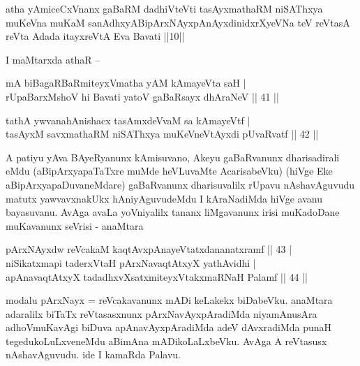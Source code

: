 \begin{shl}
atha yAmiceCxVnanx gaBaRM dadhiVteVti tasAyxmathaRM niSAThxya muKeVna muKaM sanAdhxyABipArxNAyxpAnAyxdinidxrXyeVNa teV reVtasA reVta Adada itayxreVtA Eva Bavati ||10||
\end{shl}

\begin{artha}
I maMtarxda athaR --
\end{artha}

\begin{shl}
mA biBagaRBaRmiteyxVmatha yAM kAmayeVta saH | \\
rUpaBarxMshoV hi Bavati yatoV gaBaRsayx dhAraNeV \hfill|| 41 || 
\end{shl}

\begin{shl}
tathA ywvanahAnishacx tasAmxdeVvaM sa kAmayeVtf | \\
tasAyxM savxmathaRM niSAThxya muKeVneVtAyxdi pUvaRvatf \hfill|| 42 || 
\end{shl}

\begin{artha}
A patiyu yAva BAyeRyanunx kAmisuvano, Akeyu gaBaRvanunx dharisadirali 
eMdu (aBipArxyapaTaTxre muMde heVLuvaMte AcarisabeVku) (hiVge Eke 
aBipArxyapaDuvaneMdare) gaBaRvanunx dharisuvalilx rUpavu nAshavAguvudu 
matutx yawvavxnakUkx hAniyAguvudeMdu I kAraNadiMda hiVge avanu 
bayasuvanu. AvAga avaLa yoVniyalilx tananx liMgavanunx irisi 
muKadoDane muKavanunx seVrisi - anaMtara
\end{artha}

\begin{shl}
pArxNAyx\s \s dw reVcakaM kaqtAvx\s pAnayeVtatxdananatxramf \hfill|| 43 | \\
niSikatxmapi taderxVtaH pArxNavaqtAtxyX yathAvidhi | \\
apAnavaqtAtxyX tadadhxvXsatxmiteyxVtakxmaRNaH Palamf \hfill|| 44 || 
\end{shl}

\begin{artha}
modalu pArxNayx = reVcakavanunx mADi keLakekx biDabeVku. anaMtara 
adaralilx biTaTx reVtasasxnunx pArxNavAyxpAradiMda niyamAnusAra 
adhoVmuKavAgi biDuva apAnavAyxpAradiMda adeV dAvxradiMda punaH 
tegedukoLuLxveneMdu aBimAna mADikoLaLxbeVku. AvAga A reVtasusx 
nAshavAguvudu. ide I kamaRda Palavu.
\end{artha}


